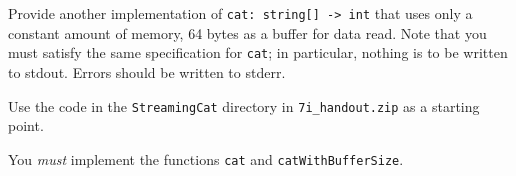 Provide another implementation of \texttt{cat: string[] -> int} that uses only a constant amount of memory, 64 bytes as a buffer for data read.  Note that you must satisfy the same specification for \texttt{cat}; in particular, nothing is to be written to stdout. Errors should be written to stderr.

Use the code in the \verb!StreamingCat! directory in \verb!7i_handout.zip! as a starting point. 

You \textit{must} implement the functions \texttt{cat} and \texttt{catWithBufferSize}.

